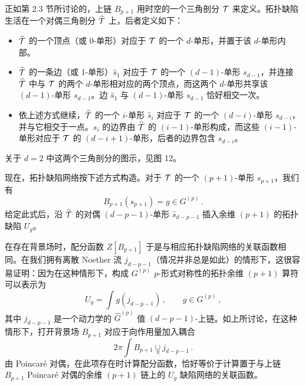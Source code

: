 正如第 2.3 节所讨论的，上链 $B_{p+1}$ 用时空的一个三角剖分 $\mathcal{T}$ 来定义。拓扑缺陷生活在一个对偶三角剖分 $\widehat{\mathcal{T}}$ 上，后者定义如下：

\begin{itemize}[leftmargin=1.4em,itemsep=1pt,topsep=1pt]
\item $\widehat{\mathcal{T}}$ 的一个顶点（或 0-单形）对应于 $\mathcal{T}$ 的一个 $d$-单形，并置于该 $d$-单形内部。
\item $\widehat{\mathcal{T}}$ 的一条边（或 1-单形）$\widehat{s}_1$ 对应于 $\mathcal{T}$ 的一个 $(d-1)$-单形 $s_{d-1}$，并连接 $\widehat{\mathcal{T}}$ 中与 $\mathcal{T}$ 的两个 $d$-单形相对应的两个顶点，而这两个 $d$-单形共享该 $(d-1)$-单形 $s_{d-1}$。边 $\widehat{s}_1$ 与 $(d-1)$-单形 $s_{d-1}$ 恰好相交一次。
\item 依上述方式继续，$\widehat{\mathcal{T}}$ 的一个 $i$-单形 $\widehat{s}_i$ 对应于 $\mathcal{T}$ 的一个 $(d-i)$-单形 $s_{d-i}$，并与它相交于一点。$s_i$ 的边界由 $\widehat{\mathcal{T}}$ 的 $(i-1)$-单形构成，而这些 $(i-1)$-单形对应于 $\mathcal{T}$ 的 $(d-i+1)$-单形，后者的边界包含 $s_{d-i}$。
\end{itemize}


关于 $d=2$ 中这两个三角剖分的图示，见图 12。

现在，拓扑缺陷网络按下述方式构造。对于 $\mathcal{T}$ 的一个 $(p+1)$-单形 $s_{p+1}$，我们有
\begin{equation}
  B_{p+1}(s_{p+1})=g\in G^{(p)}\,. \tag{4.31}
\end{equation}
给定此式后，沿 $\widehat{\mathcal{T}}$ 的对偶 $(d-p-1)$-单形 $\widehat{s}_{d-p-1}$ 插入余维 $(p+1)$ 的拓扑缺陷 $U_g$。

在存在背景场时，配分函数 $Z[B_{p+1}]$ 于是与相应拓扑缺陷网络的关联函数相同。在我们拥有离散 Noether 流 $j_{d-p-1}$（情况并非总是如此）的情形下，这很容易证明：因为在这种情形下，构成 $G^{(p)}$ $p$-形式对称性的拓扑余维 $(p+1)$ 算符可以表示为
\begin{equation}
  U_g=\int g(j_{d-p-1})\,,\qquad g\in G^{(p)}\,, \tag{4.32}
\end{equation}
其中 $j_{d-p-1}$ 是一个动力学的 $\widehat{G}^{(p)}$ 值 $(d-p-1)$-上链。如上所讨论，在这种情形下，打开背景场 $B_{p+1}$ 对应于向作用量加入耦合
\begin{equation}
  2\pi\int B_{p+1}\underset{\eta}{\cup}j_{d-p-1}\,. \tag{4.33}
\end{equation}
由 Poincaré 对偶，在此项存在时计算配分函数，恰好等价于计算置于与上链 $B_{p+1}$ Poincaré 对偶的余维 $(p+1)$ 链上的 $U_g$ 缺陷网络的关联函数。

